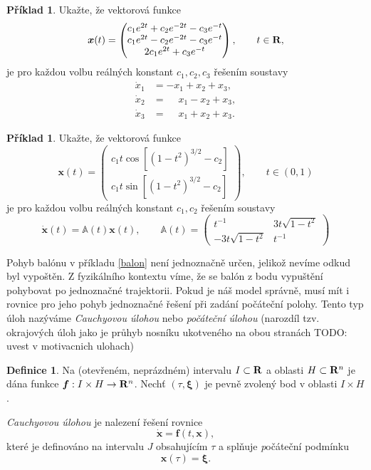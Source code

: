 \documentclass[a4paper, 12pt]{book}
\theoremstyle{definition}
\newtheorem{definition}[theorem]{Definice}
\newtheorem{example}[theorem]{Příklad}
\def\to{\rightarrow}
\def\Real{{\rm\bf R}}
\def\vc#1{\mathbf{\boldsymbol{#1}}}     %
\def\tn#1{{\mathbb{#1}}}    %
\def\todo#1{{\color{green}TODO:} #1}
\begin{document}
\begin{example}
Ukažte, že vektorová funkce
\[
\vc x(t) = \begin{pmatrix}
c_1 e^{2t} + c_2 e^{-2t} - c_3 e^{-t}\\
c_1 e^{2t} - c_2 e^{-2t} - c_3 e^{-t}\\
2c_1 e^{2t} + c_3 e^{-t}
\end{pmatrix}, \qquad t\in \Real,
\]
je pro každou volbu reálných konstant $c_1, c_2, c_3$ řešením soustavy
\begin{align*}
\dot x_1 &= -x_1 + x_2 + x_3,\\
\dot x_2 &= \phantom{-}x_1 - x_2 + x_3,\\
\dot x_3 &= \phantom{-}x_1 + x_2 + x_3. 
\end{align*}
\end{example}

\begin{example}
Ukažte, že vektorová funkce
\[
\vc x(t) = \begin{pmatrix}
c_1 t \cos [(1-t^2)^{3/2}-c_2]\\
c_1 t \sin [(1-t^2)^{3/2}-c_2]
\end{pmatrix}, \qquad t\in(0, 1)
\]
je pro každou volbu reálných konstant $c_1, c_2$ řešením soustavy
\[
\dot{\vc x}(t) = \tn A(t) \vc x(t),\qquad
\tn A(t)=\begin{pmatrix}
t^{-1}  &  3t\sqrt{1-t^2}\\
-3t\sqrt{1-t^2} & t^{-1}
\end{pmatrix}
\]
\end{example}

Pohyb balónu v příkladu \ref{balon} není jednoznačně určen, jelikož nevíme odkud byl vypoštěn. 
Z fyzikálního kontextu víme, že se balón z bodu vypuštění pohybovat po jednoznačné trajektorii. Pokud je 
náš model správně, musí mít i rovnice pro jeho pohyb jednoznačné řešení při zadání počáteční polohy. 
Tento typ úloh nazýváme {\it Cauchyovou úlohou} nebo {\it počáteční úlohou} 
(narozdíl tzv. okrajových úloh jako je průhyb nosníku ukotveného na obou stranách \todo{uvest v motivacnich ulohach})

\begin{definition}
\label{Cauchy}
Na (otevřeném, neprázdném) intervalu $I \subset \Real$  a oblasti $H \subset \Real^n$ je 
dána funkce $\vc f: I\times H \to \Real^n$. Nechť $(\tau, \vc \xi)$ je pevně zvolený bod v oblasti $I\times H$.

\emph{Cauchyovou úlohou} je nalezení řešení rovnice
\[
    \dot{\vc x} = \vc f(t,\vc x),
\]
které je definováno na intervalu $J$ obsahujícím $\tau$ a splňuje {\emph počáteční podmínku}
\[
    \vc x(\tau)=\vc \xi.
\]
\end{definition}
\end{document}
